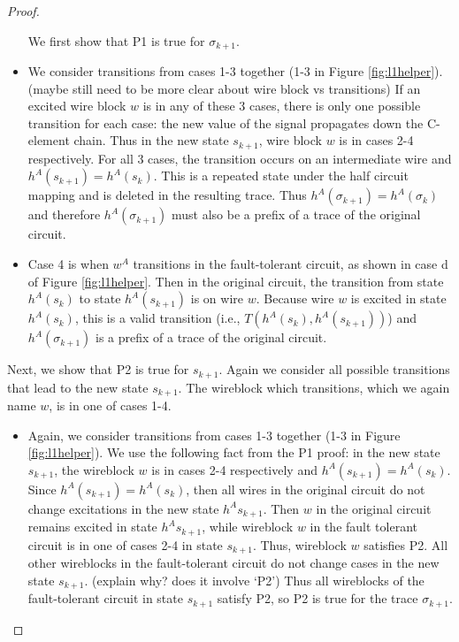 \documentclass[12pt]{report}
\begin{document}
\begin{proof}
\begin{itemize}
We first show that P1 is true for $\sigma_{k+1}$.  
\item We consider transitions from cases 1-3 together (1-3 in Figure \ref{fig:l1helper}). (maybe still need to be more clear about wire block vs transitions) 
If an excited wire block $w$ is in any of these 3 cases, there is only one possible transition for each case: the new value of the signal propagates down the C-element chain.  Thus in the new state $s_{k+1}$, wire block $w$ is in cases 2-4 respectively.  For all 3 cases, the transition occurs on an intermediate wire and $h^A(s_{k+1})=h^A(s_{k})$.  This is a repeated state under the half circuit mapping and is deleted in the resulting trace.  Thus $h^{A}(\sigma_{k+1})=h^{A}(\sigma_k)$ and therefore $h^{A}(\sigma_{k+1})$ must also be a prefix of a trace of the original circuit. 
\item Case 4 is when $w^A$ transitions in the fault-tolerant circuit, as shown in case d of Figure \ref{fig:l1helper}.  Then in the original circuit, the transition from state $h^A(s_k)$ to state $h^A(s_{k+1})$ is on wire $w$.  Because wire $w$ is excited in state $h^A(s_k)$, this is a valid transition (i.e., $T(h^A(s_k), h^A(s_{k+1}))$) and $h^{A}(\sigma_{k+1})$ is a prefix of a trace of the original circuit. 
\end{itemize}

Next, we show that P2 is true for $s_{k+1}$.  Again we consider all possible transitions that lead to the new state $s_{k+1}$.  The wireblock which transitions, which we again name $w$, is in one of cases 1-4.  

\begin{itemize}
\item Again, we consider transitions from cases 1-3 together (1-3 in Figure \ref{fig:l1helper}).  We use the following fact from the P1 proof: in the new state $s_{k+1}$, the wireblock $w$ is in cases 2-4 respectively and $h^A(s_{k+1})=h^A(s_{k})$.  Since $h^A(s_{k+1})=h^A(s_{k})$, then all wires in the original circuit do not change excitations in the new state $h^A{s_{k+1}}$.  Then $w$ in the original circuit remains excited in state $h^A{s_{k+1}}$, while wireblock $w$ in the fault tolerant circuit is in one of cases 2-4 in state $s_{k+1}$.  Thus, wireblock $w$ satisfies P2.  All other wireblocks in the fault-tolerant circuit do not change cases in the new state $s_{k+1}$.  (explain why? does it involve `P2')  
Thus all wireblocks of the fault-tolerant circuit in state $s_{k+1}$ satisfy P2, so P2 is true for the trace $\sigma_{k+1}$.     


\end{itemize}
\end{proof}
\end{document}
